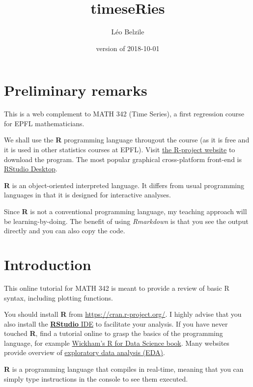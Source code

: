 \documentclass[]{book}
\title{timeseRies}
\author{Léo Belzile}
\date{version of 2018-10-01}
\begin{document}
\maketitle

{
\setcounter{tocdepth}{1}
\tableofcontents
}
\chapter*{Preliminary remarks}\label{preliminary-remarks}

This is a web complement to MATH 342 (Time Series), a first regression
course for EPFL mathematicians.

We shall use the \textbf{R} programming language througout the course
(as it is free and it is used in other statistics courses at EPFL).
Visit \href{https://cran.r-project.org/}{the R-project website} to
download the program. The most popular graphical cross-platform
front-end is
\href{https://www.rstudio.com/products/rstudio/download/}{RStudio
Desktop}.

\textbf{R} is an object-oriented interpreted language. It differs from
usual programming languages in that it is designed for interactive
analyses.

Since \textbf{R} is not a conventional programming language, my teaching
approach will be learning-by-doing. The benefit of using
\emph{Rmarkdown} is that you see the output directly and you can also
copy the code.

\chapter{Introduction}\label{introduction}

This online tutorial for MATH 342 is meant to provide a review of basic
R syntax, including plotting functions.

You should install \textbf{R} from \url{https://cran.r-project.org/}. I
highly advise that you also install the
\href{http://rstudio.com}{\textbf{RStudio} IDE} to facilitate your
analysis. If you have never touched \textbf{R}, find a tutorial online
to grasp the basics of the programming language, for example
\href{http://r4ds.had.co.nz/}{Wickham's R for Data Science book}. Many
websites provide overview of
\href{http://r4ds.had.co.nz/exploratory-data-analysis.html}{exploratory
data analysis (EDA)}.

\textbf{R} is a programming language that compiles in real-time, meaning
that you can simply type instructions in the console to see them
executed.
\end{document}
